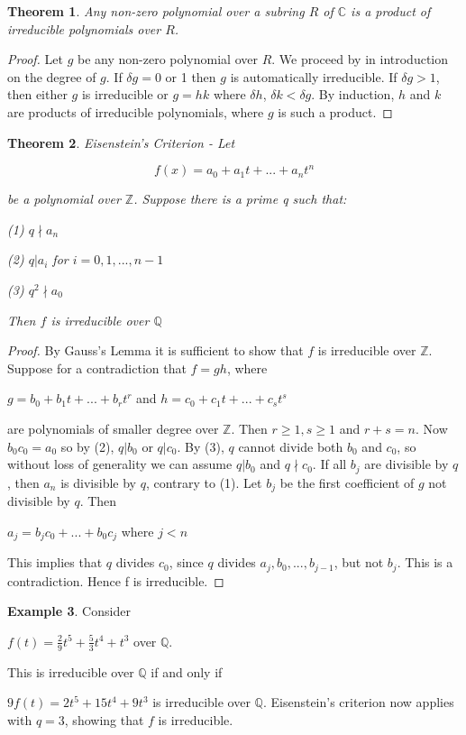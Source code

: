 \documentclass[12pt]{article}
\newtheorem{theorem}{Theorem}
\theoremstyle{definition}
\newtheorem{example}[theorem]{Example}
\newcommand{\Z}{\mathbb Z}
\newcommand{\Q}{\mathbb Q}
\begin{document}
\begin{theorem}
    Any non-zero polynomial over a subring $R$ of $\mathbb{C}$ is a product of irreducible polynomials over $R$.
\end{theorem}

\begin{proof}
    Let $g$ be any non-zero polynomial over $R$. We proceed by in introduction on the degree of $g$. If $\delta g = 0$ or 1 then $g$ is automatically irreducible. If $\delta g > 1$, then either $g$ is irreducible or $g = hk$ where $\delta h$, $\delta k < \delta g$. By induction, $h$ and $k$ are products of irreducible polynomials, where $g$ is such a product.
\end{proof}

\begin{theorem}
    Eisenstein's Criterion - Let 
    
    $$f(x) = a_0 + a_1 t + ... + a_n t^n$$
    
    be a polynomial over $\Z$. Suppose there is a prime q such that:
    
    (1) $q \nmid a_n$

    (2) $q | a_i$ for $i = {0, 1,..., n-1}$

    (3) $q^2 \nmid a_0$

    Then $f$ is irreducible over $\Q$
\end{theorem}

\begin{proof}
By Gauss's Lemma it is sufficient to show that $f$ is irreducible over $\Z$. Suppose for a contradiction that $f = gh$, where

$g=b_0+b_1 t+ ... +b_r t^r$ and $h=c_0+c_1 t+ ... +c_s t^s$

are polynomials of smaller degree over $\Z$. Then $r \ge 1, s \ge 1$ and $r+s = n$. Now $b_0 c_0 = a_0$ so by (2), $q | b_0$ or $q|c_0$. By (3), $q$ cannot divide both $b_0$ and $c_0$, so without
loss of generality we can assume $q | b_0$ and $q \nmid c_0$. If all $b_j$ are divisible by $q$, then $a_n$ is divisible by $q$, contrary to (1). Let $b_j$ be the first coefficient of $g$ not divisible by $q$. Then

$a_j = b_j c_0 + ...+ b_0 c_j$ where $j < n$

 This implies that $q$ divides $c_0$, since $q$ divides $a_j, b_0,..., b_{j-1}$, but not $b_j$. This is a contradiction. Hence f is irreducible.
\end{proof}

\begin{example}
Consider

$f(t) = \frac{2}{9} t^5 + \frac{5}{3} t^4 + t^3$ over $\Q$.

This is irreducible over $\Q$ if and only if

$9f(t) = 2t^5 + 15t^4 + 9t^3$ is irreducible over $\Q$. Eisenstein's criterion now applies with $q = 3$, showing that $f$ is irreducible.
\end{example}
\end{document}
